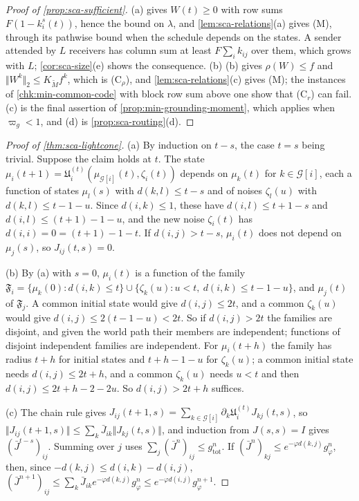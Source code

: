 \begin{proof}[Proof of \cref{prop:sca-sufficient}]
(a)  gives $W(t)\ge0$ with row sums $F(1-k^s_i(t))$, hence the bound on $\lambda$, and \cref{lem:sca-relations}(a) gives \textup{(M)}, through its pathwise bound when the schedule depends on the states. A sender attended by $L$ receivers has column sum at least $F\sum_ik_{ij}$ over them, which grows with $L$; \cref{cor:sca-size}(e) shows the consequence. (b) (b) gives $\rho(W)\le f$ and $\Vert W^k\Vert_2\le K_{\tilde M}f^k$, which is \textup{(C$_\rho$)}, and \cref{lem:sca-relations}(c) gives \textup{(M)}; the instances of \cref{chk:min-common-code} with block row sum above one show that \textup{(C$_r$)} can fail. (c) is the final assertion of \cref{prop:min-grounding-moment}, which applies when $\varpi_g<1$, and (d) is \cref{prop:sca-routing}(d).
\end{proof}

\begin{proof}[Proof of \cref{thm:sca-lightcone}]
(a) By induction on $t-s$, the case $t=s$ being trivial. Suppose the claim holds at $t$. The state $\mu_i(t+1)=\mathfrak U^{(t)}_i(\mu_{\mathcal G[i]}(t),\zeta_i(t))$ depends on $\mu_k(t)$ for $k\in\mathcal G[i]$, each a function of states $\mu_l(s)$ with $d(k,l)\le t-s$ and of noises $\zeta_l(u)$ with $d(k,l)\le t-1-u$. Since $d(i,k)\le1$, these have $d(i,l)\le t+1-s$ and $d(i,l)\le(t+1)-1-u$, and the new noise $\zeta_i(t)$ has $d(i,i)=0=(t+1)-1-t$. If $d(i,j)>t-s$, $\mu_i(t)$ does not depend on $\mu_j(s)$, so $J_{ij}(t,s)=0$.

(b) By (a) with $s=0$, $\mu_i(t)$ is a function of the family $\mathfrak F_i=\{\mu_k(0):d(i,k)\le t\}\cup\{\zeta_k(u):u<t,\ d(i,k)\le t-1-u\}$, and $\mu_j(t)$ of $\mathfrak F_j$. A common initial state would give $d(i,j)\le2t$, and a common $\zeta_k(u)$ would give $d(i,j)\le2(t-1-u)<2t$. So if $d(i,j)>2t$ the families are disjoint, and given the world path their members are independent; functions of disjoint independent families are independent. For $\mu_i(t+h)$ the family has radius $t+h$ for initial states and $t+h-1-u$ for $\zeta_k(u)$; a common initial state needs $d(i,j)\le2t+h$, and a common $\zeta_k(u)$ needs $u<t$ and then $d(i,j)\le2t+h-2-2u$. So $d(i,j)>2t+h$ suffices.

(c) The chain rule gives $J_{ij}(t+1,s)=\sum_{k\in\mathcal G[i]}\partial_k\mathfrak U^{(t)}_iJ_{kj}(t,s)$, so $\Vert J_{ij}(t+1,s)\Vert\le\sum_k\bar J_{ik}\Vert J_{kj}(t,s)\Vert$, and induction from $J(s,s)=I$ gives $(\bar J^{t-s})_{ij}$. Summing over $j$ uses $\sum_j(\bar J^n)_{ij}\le g_{\mathrm{tot}}^n$. If $(\bar J^n)_{kj}\le e^{-\varphi d(k,j)}g_\varphi^n$, then, since $-d(k,j)\le d(i,k)-d(i,j)$, $(\bar J^{n+1})_{ij}\le\sum_k\bar J_{ik}e^{-\varphi d(k,j)}g_\varphi^n\le e^{-\varphi d(i,j)}g_\varphi^{n+1}$.
\end{proof}

